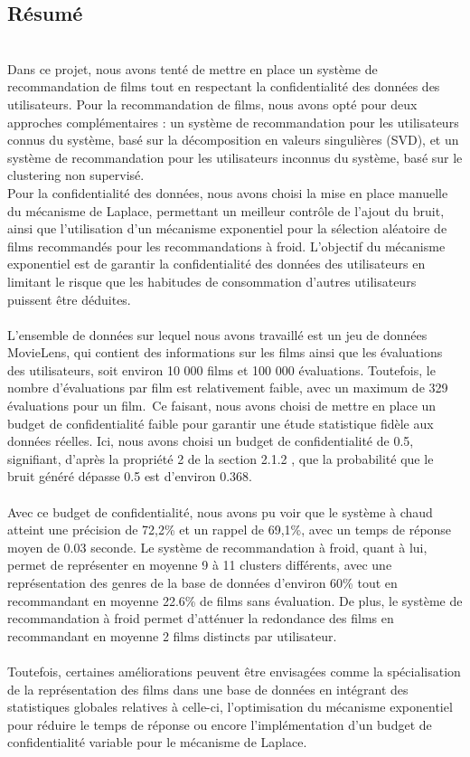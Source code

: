 \documentclass{article}
\begin{document}
\subsection{Résumé}
$ $\\
Dans ce projet, nous avons tenté de mettre en place un système de recommandation de films tout en respectant la confidentialité des données des utilisateurs.
Pour la recommandation de films, nous avons opté pour deux approches complémentaires : un système de recommandation pour les utilisateurs connus du système, 
basé sur la décomposition en valeurs singulières (SVD), et un système de recommandation pour les utilisateurs inconnus du système, basé sur le clustering non supervisé.\\
Pour la confidentialité des données, nous avons choisi la mise en place manuelle du mécanisme de Laplace, permettant un meilleur
contrôle de l'ajout du bruit, ainsi que l'utilisation d'un mécanisme exponentiel pour la sélection aléatoire de films recommandés pour les recommandations à froid.
L'objectif du mécanisme exponentiel est de garantir la confidentialité des données des utilisateurs en limitant le risque que les habitudes de consommation d'autres utilisateurs puissent être déduites.\\
\\
L'ensemble de données sur lequel nous avons travaillé est un jeu de données MovieLens, qui contient des informations sur les films ainsi que les évaluations des utilisateurs, soit environ 
10 000 films et 100 000 évaluations. Toutefois, le nombre d'évaluations par film est relativement faible, avec un maximum de 329 évaluations pour un film.\
Ce faisant, nous avons choisi de mettre en place un budget de confidentialité faible pour garantir une étude statistique fidèle aux données réelles. Ici, nous avons choisi un budget de confidentialité de 0.5, 
signifiant, d'après la propriété 2 de la section 2.1.2 , que la probabilité que le bruit généré dépasse 0.5 est d'environ 0.368.\\
\\
Avec ce budget de confidentialité, nous avons pu voir que le système à chaud atteint une précision de 72,2\% et un rappel de 69,1\%, avec un temps de réponse moyen de 0.03 seconde.
Le système de recommandation à froid, quant à lui, permet de représenter en moyenne 9 à 11 clusters différents, avec une représentation des genres de la base de données d'environ 60\% tout 
en recommandant en moyenne 22.6\% de films sans évaluation. De plus, le système de recommandation à froid permet d’atténuer la redondance des films en recommandant en moyenne 2 films distincts par utilisateur.\\
\\
Toutefois, certaines améliorations peuvent être envisagées comme la spécialisation de la représentation des films dans une base de données en intégrant des statistiques globales relatives à celle-ci, 
l'optimisation du mécanisme exponentiel pour réduire le temps de réponse ou encore l'implémentation d'un budget de confidentialité variable pour le mécanisme de Laplace.\\
\end{document}
